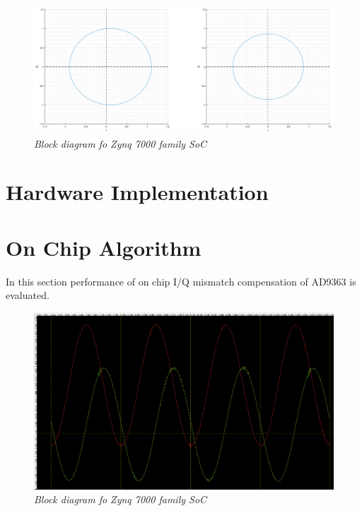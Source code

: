 \documentclass[en,printmode]{mgr}
\begin{document}
			\begin{figure}[!htb]
    			\centering
   				\includegraphics[width=\textwidth]{plots/gauss_c.png}
   			 	\caption{\textit{Block diagram fo Zynq 7000 family SoC}}
			\end{figure}
	\section{Hardware Implementation}
	\section{On Chip Algorithm}
		In this section performance of on chip I/Q mismatch compensation of AD9363 is evaluated.
		\begin{figure}[!htb]
    			\centering
   				\includegraphics[width=\textwidth]{plots/chip_sine_dc.png}
   			 	\caption{\textit{Block diagram fo Zynq 7000 family SoC}}
		\end{figure}
		
\end{document}
